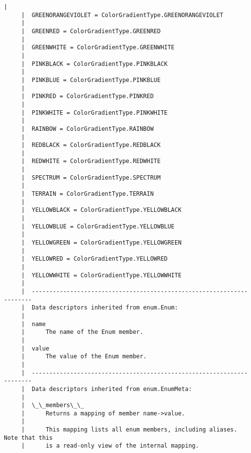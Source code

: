 \documentclass[11pt]{article}
\begin{document}
\begin{Verbatim}[commandchars=\\\{\}]
     |  
     |  GREENORANGEVIOLET = ColorGradientType.GREENORANGEVIOLET
     |  
     |  GREENRED = ColorGradientType.GREENRED
     |  
     |  GREENWHITE = ColorGradientType.GREENWHITE
     |  
     |  PINKBLACK = ColorGradientType.PINKBLACK
     |  
     |  PINKBLUE = ColorGradientType.PINKBLUE
     |  
     |  PINKRED = ColorGradientType.PINKRED
     |  
     |  PINKWHITE = ColorGradientType.PINKWHITE
     |  
     |  RAINBOW = ColorGradientType.RAINBOW
     |  
     |  REDBLACK = ColorGradientType.REDBLACK
     |  
     |  REDWHITE = ColorGradientType.REDWHITE
     |  
     |  SPECTRUM = ColorGradientType.SPECTRUM
     |  
     |  TERRAIN = ColorGradientType.TERRAIN
     |  
     |  YELLOWBLACK = ColorGradientType.YELLOWBLACK
     |  
     |  YELLOWBLUE = ColorGradientType.YELLOWBLUE
     |  
     |  YELLOWGREEN = ColorGradientType.YELLOWGREEN
     |  
     |  YELLOWRED = ColorGradientType.YELLOWRED
     |  
     |  YELLOWWHITE = ColorGradientType.YELLOWWHITE
     |  
     |  ----------------------------------------------------------------------
     |  Data descriptors inherited from enum.Enum:
     |  
     |  name
     |      The name of the Enum member.
     |  
     |  value
     |      The value of the Enum member.
     |  
     |  ----------------------------------------------------------------------
     |  Data descriptors inherited from enum.EnumMeta:
     |  
     |  \_\_members\_\_
     |      Returns a mapping of member name->value.
     |      
     |      This mapping lists all enum members, including aliases. Note that this
     |      is a read-only view of the internal mapping.
    

\end{Verbatim}
\end{document}
